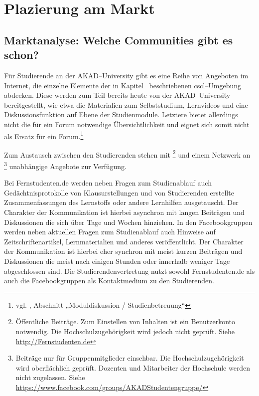 \section{Plazierung am Markt} %
\label{sec:plazierung_am_markt}

\subsection{Marktanalyse: Welche Communities gibt es schon?} %
\label{sub:marktanalyse_welche_communities_gibt_es_schon}
Für Studierende an der AKAD–University gibt es eine Reihe von Angeboten im Internet, die einzelne Elemente der in Kapitel~ beschriebenen \ac{cscl}–Umgebung abdecken. Diese werden zum Teil bereits heute von der AKAD–University bereitgestellt, wie etwa die Materialien zum Selbststudium, Lernvideos und eine Diskussionsfunktion auf Ebene der Studienmodule. Letztere bietet allerdings nicht die für ein Forum notwendige Übersichtlichkeit und eignet sich somit nicht als Ersatz für ein Forum.\footnote{vgl. \cite{defstud}, Abschnitt „Moduldiskussion / Studienbetreuung“}

Zum Austausch zwischen den Studierenden stehen mit \footnote{Öffentliche Beiträge. Zum Einstellen von Inhalten ist ein Benutzerkonto notwendig. Die Hochschulzugehörigkeit wird jedoch nicht geprüft. Siehe \url{http://Fernstudenten.de}} und einem Netzwerk an \footnote{Beiträge nur für Gruppenmitglieder einsehbar. Die Hochschulzugehörigkeit wird oberflächlich geprüft. Dozenten und Mitarbeiter der Hochschule werden nicht zugelassen. Siehe \url{https://www.facebook.com/groups/AKADStudentengruppe/}} unabhängige Angebote zur Verfügung.

Bei Fernstudenten.de werden neben Fragen zum Studienablauf auch Gedächtnisprotokolle von Klausurstellungen und von Studierenden erstellte Zusammenfassungen des Lernstoffs oder andere Lernhilfen ausgetauscht. Der Charakter der Kommunikation ist hierbei asynchron mit langen Beiträgen und Diskussionen die sich über Tage und Wochen hinziehen. In den Facebookgruppen werden neben aktuellen Fragen zum Studienablauf auch Hinweise auf Zeitschriftenartikel, Lernmaterialien und anderes veröffentlicht. Der Charakter der Kommunikation ist hierbei eher synchron mit meist kurzen Beiträgen und Diskussionen die meist nach einigen Stunden oder innerhalb weniger Tage abgeschlossen sind.
Die Studierendenvertretung nutzt sowohl Fernstudenten.de als auch die Facebookgruppen als Kontaktmedium zu den Studierenden.

